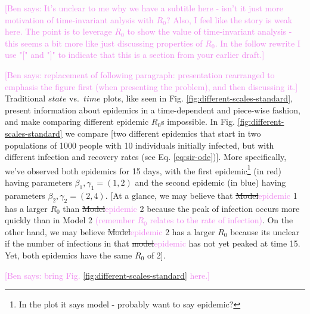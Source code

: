 \documentclass[
  shortnames]{jss}
\begin{document}
\textcolor{violet}{[Ben says: It's unclear to me why we have a subtitle here - isn't it just more motivation of time-invariant anlysis with $R_0$? Also, I feel like the story is weak here. The point is to leverage $R_0$ to show the value of time-invariant analysis - this seems a bit more like just discussing properties of $R_0$. In the follow rewrite I use "[" and "]" to indicate that this is a section from your earlier draft.]}

\textcolor{violet}{[Ben says: replacement of following paragraph: presentation rearranged to emphasis the figure first (when presenting the problem), and then discussing it.]}
Traditional \(state\) vs.~\(time\) plots, like seen in Fig.
\ref{fig:different-scales-standard}, present information about epidemics
in a time-dependent and piece-wise fashion, and make comparing different
epidemic \(R_0\)s impossible. In Fig.
\ref{fig:different-scales-standard} we compare {[}two different
epidemics that start in two populations of 1000 people with 10
individuals initially infected, but with different infection and
recovery rates (see Eq. \ref{eq:sir-ode}){]}. More specifically, we've
observed both epidemics for 15 days, with the first
epidemic\footnote{In the plot it says model - probably want to say epidemic?}
(in red) having parameters \(\beta_1, \gamma_1 = (1,2)\) and the second
epidemic (in blue) having parameters \(\beta_2, \gamma_2 = (2,4)\).
{[}At a glance, we may believe that
\sout{Model}\textcolor{violet}{epidemic} 1 has a larger \(R_0\) than
\sout{Model}\textcolor{violet}{epidemic} 2 because the peak of infection
occurs more quickly than in Model 2
\textcolor{violet}{(remember $R_0$ relates to the rate of infection)}.
On the other hand, we may believe
\sout{Model}\textcolor{violet}{epidemic} 2 has a larger \(R_0\) because
its unclear if the number of infections in that
\sout{model}\textcolor{violet}{epidemic} has not yet peaked at time 15.
Yet, both epidemics have the same \(R_0\) of 2{]}.

\textcolor{violet}{[Ben says: bring Fig. \ref{fig:different-scales-standard} here.]}
\end{document}
